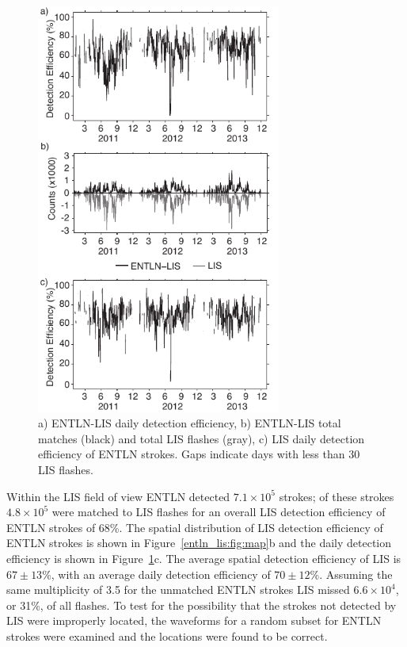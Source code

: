 \begin{figure}[t]
   \centering
   \noindent\includegraphics[width=19pc,angle=0]{entln_lis/Figures/de.pdf}
   \caption{a) ENTLN-LIS daily detection efficiency,
   		b) ENTLN-LIS total matches (black) and total LIS flashes (gray),
		c) LIS daily detection efficiency of ENTLN strokes.
		Gaps indicate days with less than 30 LIS flashes.
		}
   \label{entln_lis:fig:de}
\end{figure}

Within the LIS field of view ENTLN detected $7.1\times10^5$ strokes; of these strokes $4.8\times10^5$ were matched to LIS flashes for an overall LIS detection efficiency of ENTLN strokes of 68\%.
The spatial distribution of LIS detection efficiency of ENTLN strokes is shown in Figure~\ref{entln_lis:fig:map}b and the daily detection efficiency is shown in Figure~\ref{entln_lis:fig:de}c.
The average spatial detection efficiency of LIS is $67 \pm 13$\%, with an average daily detection efficiency of $70 \pm 12$\%.
Assuming the same multiplicity of 3.5 for the unmatched ENTLN strokes LIS missed $6.6\times10^4$, or 31\%, of all flashes.
To test for the possibility that the strokes not detected by LIS were improperly located, the waveforms for a random subset for ENTLN strokes were examined and the locations were found to be correct.

